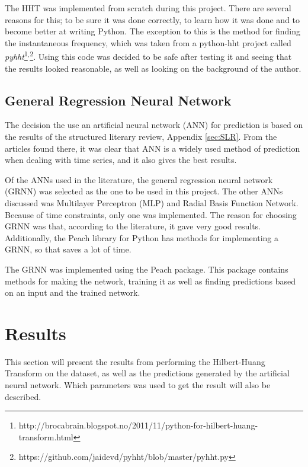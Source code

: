 \documentclass[12pt]{article}
\begin{document}
		The HHT was implemented from scratch during this project. There are several reasons for this; to be sure it was done correctly, to learn how it was done and to become better at writing Python.  The exception to this is the method for finding the instantaneous frequency, which was taken from a python-hht project called \textit{pyhht}\footnote{http://brocabrain.blogspot.no/2011/11/python-for-hilbert-huang-transform.html}$^{,}$\footnote{https://github.com/jaidevd/pyhht/blob/master/pyhht.py}. Using this code was decided to be safe after testing it and seeing that the results looked reasonable, as well as looking on the background of the author. 
		
	
	\subsection{General Regression Neural Network} 
		\label{sec:prediction}
		The decision the use an artificial neural network (ANN) for prediction is based on the results of the structured literary review, Appendix \ref{sec:SLR}. From the articles found there, it was clear that ANN is a widely used method of prediction when dealing with time series, and it also gives the best results. 
		
		Of the ANNs used in the literature, the general regression neural network (GRNN) was selected as the one to be used in this project. The other ANNs discussed was Multilayer Perceptron (MLP) and Radial Basis Function Network. Because of time constraints, only one was implemented. The reason for choosing GRNN was that, according to the literature, it gave very good results. Additionally, the Peach library for Python has methods for implementing a GRNN, so that saves a lot of time.
		
		The GRNN was implemented using the Peach package. This package contains methods for making the network, training it as well as finding predictions based on an input and the trained network. 
		
	
	
	
	


\newpage
\section{Results}
	\label{sec:results}
	This section will present the results from performing the Hilbert-Huang Transform on the dataset, as well as the predictions generated by the artificial neural network. Which parameters was used to get the result will also be described. 
\end{document}
